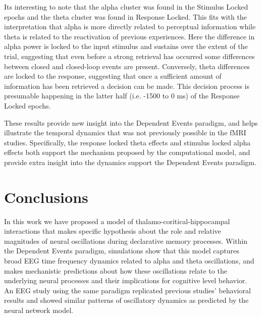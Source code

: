 \documentclass[11pt, titlepage, twoside]{article}
\begin{document}
Its interesting to note that the alpha cluster was found in the Stimulus Locked epochs and the theta cluster was found in Response Locked.  This fits with the interpretation that alpha is more directly related to perceptual information while theta is related to the reactivation of previous experiences.  Here the difference in alpha power is locked to the input stimulus and sustains over the extent of the trial, suggesting that even before a strong retrieval has occurred some differences between closed and closed-loop events are present.  Conversely, theta differences are locked to the response, suggesting that once a sufficient amount of information has been retrieved a decision can be made.  This decision process is presumable happening in the latter half (i.e. -1500 to 0 ms) of the Response Locked epochs.

These results provide new insight into the Dependent Events paradigm, and helps illustrate the temporal dynamics that was not previously possible in the fMRI studies.  Specifically, the response locked theta effects and stimulus locked alpha effects both support the mechanism proposed by the computational model, and provide extra insight into the dynamics support the Dependent Events paradigm.    



\section{Conclusions}\label{sec:conclusions}

In this work we have proposed a model of thalamo-coritical-hippocampal interactions that makes specific hypothesis about the role and relative magnitudes of neural oscillations during declarative memory processes.  Within the Dependent Events paradigm, simulations show that this model captures broad EEG time frequency dynamics related to alpha and theta oscillations, and makes mechanistic predictions about how these oscillations relate to the underlying neural processes and their implications for cognitive level behavior.  An EEG study using the same paradigm replicated previous studies' behavioral results and showed similar patterns of oscillatory dynamics as predicted by the neural network model.  
\end{document}
